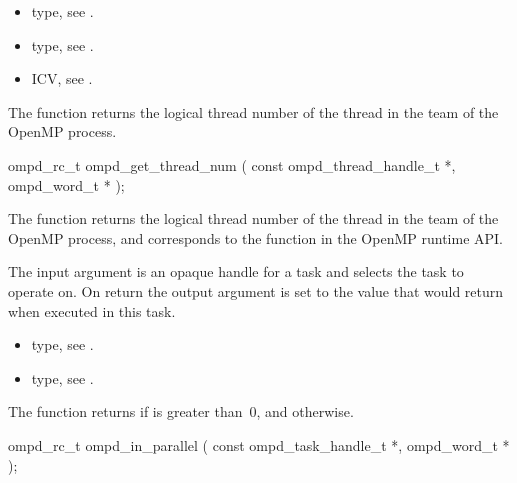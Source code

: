 \crossreferences
\begin{itemize}
	\item {} type, see .
	\item {} type, see .
	\item {} ICV, see .
\end{itemize}

\label{subsubsubsec:ompd_get_thread_num}
\summary
The  function returns the logical thread number of the thread in the team of the OpenMP process.

\format
\begin{cspecific}
\begin{ompSyntax}
ompd_rc_t ompd_get_thread_num (
  const ompd_thread_handle_t *,
  ompd_word_t *
);
\end{ompSyntax}
\end{cspecific}

\descr
The  function returns the logical thread number of the thread in the team of the OpenMP process, and
corresponds to the  function in the OpenMP runtime API.


\argdesc
The input argument  is an opaque handle for a task and selects the task to operate on.
On return the output argument  is set to the value that  would return when
executed in this task.

\crossreferences
\begin{itemize}
	\item {} type, see .
	\item {} type, see .
\end{itemize}


\label{subsubsubsec:ompd_in_parallel}
\summary
The  function returns  if  is greater than~0, and  otherwise.

\format
\begin{cspecific}
\begin{ompSyntax}
ompd_rc_t ompd_in_parallel (
  const ompd_task_handle_t *,
  ompd_word_t *
);
\end{ompSyntax}
\end{cspecific}

